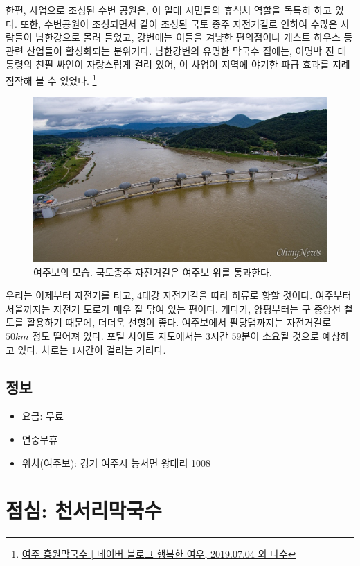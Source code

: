 한편, 사업으로 조성된 수변 공원은, 이 일대 시민들의 휴식처 역할을 독특히 하고 있다.
또한, 수변공원이 조성되면서 같이 조성된 국토 종주 자전거길로 인하여 수많은 사람들이 남한강으로 몰려 들었고,
강변에는 이들을 겨냥한 편의점이나 게스트 하우스 등 관련 산업들이 활성화되는 분위기다.
남한강변의 유명한 막국수 집에는, 이명박 젼 대통령의 친필 싸인이 자랑스럽게 걸려 있어,
이 사업이 지역에 야기한 파급 효과를 지례 짐작해 볼 수 있었다.
\footnote{\href{https://blog.naver.com/lovelyiii/221577715597}{여주 흥원막국수 | 네이버 블로그 행복한 여우, 2019.07.04 외 다수}}

\begin{figure}
    \centering
    \includegraphics[width=.6\textwidth]{img/여주보.jpg}
    \caption{여주보의 모습. 국토종주 자전거길은 여주보 위를 통과한다. \protect\footnotemark}
    \label{fig:my_labe7}
\end{figure}


우리는 이제부터 자전거를 타고, 4대강 자전거길을 따라 하류로 향할 것이다.
여주부터 서울까지는 자전거 도로가 매우 잘 닦여 있는 편이다.
게다가, 양평부터는 구 중앙선 철도를 활용하기 때문에, 더더욱 선형이 좋다.
여주보에서 팔당댐까지는 자전거길로 $50km$ 정도 떨어져 있다. 
포털 사이트 지도에서는 3시간 59분이 소요될 것으로 예상하고 있다.
차로는 1시간이 걸리는 거리다.

\subsection{정보}
\begin{itemize}
    \item 요금: 무료
    \item 연중무휴
    \item 위치(여주보): 경기 여주시 능서면 왕대리 1008 
\end{itemize}

\section{점심: 천서리막국수}


